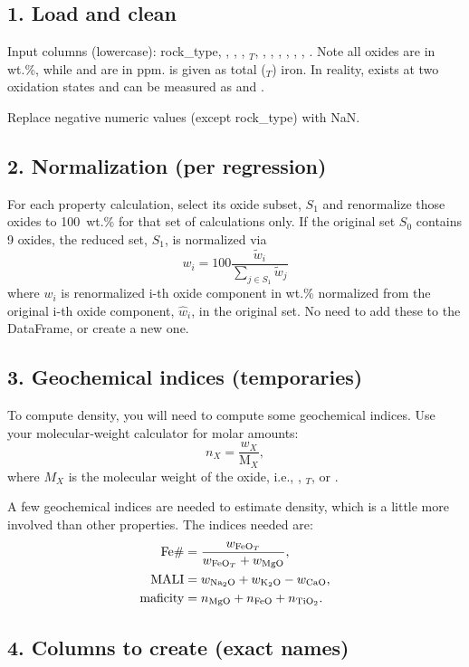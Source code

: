 \documentclass[11pt,a4paper]{article}
\begin{document}
\subsection*{1. Load and clean}
Input columns (lowercase): rock\_type, , , , $_{T}$, , , , , , , .  Note all oxides are in wt.\%, while  and  are in ppm.   is given as total ($_T$) iron.  In reality,  exists at two oxidation states and can be measured as  and .

Replace negative numeric values (except rock\_type) with NaN.

\subsection*{2. Normalization (per regression)}
For each property calculation, select its oxide subset, \(S_1\) and renormalize those oxides to 100~wt.\% for that set of calculations only.  If the original set \(S_0\) contains 9 oxides, the reduced set, \(S_1\), is normalized via
\[
  w_i = 100 \frac{\tilde{w}_i}{\sum_{j\in S_1} \tilde{w}_j}
\]
where $w_i$ is renormalized i-th oxide component in wt.\% normalized from the original i-th oxide component, $\hat{w}_i$, in the original set.  No need to add these to the DataFrame, or create a new one.

\subsection*{3. Geochemical indices (temporaries)}
To compute density, you will need to compute some geochemical indices.  Use your molecular‐weight calculator for molar amounts:
\[
  n_X = \frac{w_X}{\mathrm{M}_X},
\]
where $M_X$ is the molecular weight of the oxide, i.e., , $_{T}$, or .

A few geochemical indices are needed to estimate density, which is a little more involved than other properties.  The indices needed are:
\begin{align*}
  \mathrm{Fe\#} &= \frac{w_{\ce{FeO}_{T}}}{w_{\ce{FeO}_{T}} + w_{\ce{MgO}}},\\
  \mathrm{MALI} &= w_{\ce{Na2O}} + w_{\ce{K2O}} - w_{\ce{CaO}},\\
  \mathrm{maficity} &= n_{\ce{MgO}} + n_{\ce{FeO}} + n_{\ce{TiO2}}.
\end{align*}

\subsection*{4. Columns to create (exact names)}
\end{document}
